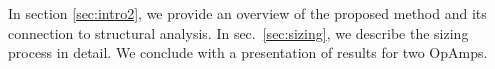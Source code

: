 \documentclass[conference]{IEEEtran}
\begin{document}
 	In section \ref{sec:intro2}, we provide an overview of the proposed method and its connection to structural analysis. 
 	In sec.~\ref{sec:sizing}, we describe the sizing process in detail. We conclude with a presentation of results for two OpAmps.
	
%
\end{document}
